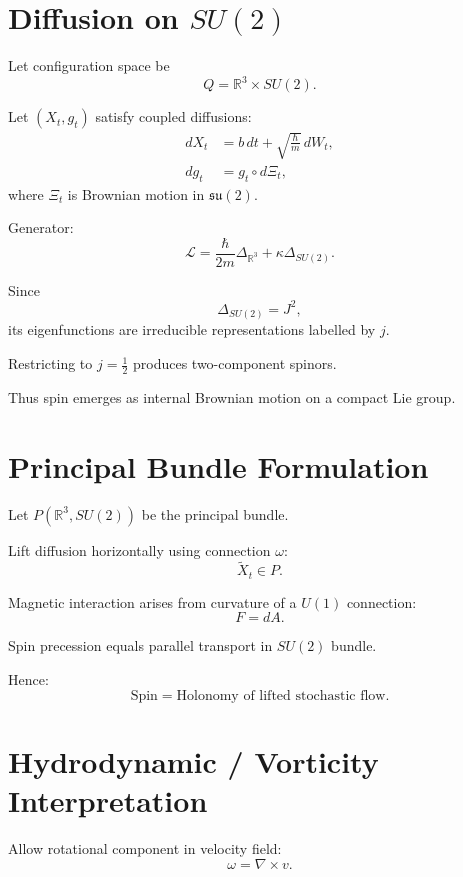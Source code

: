 \documentclass[12pt]{article}
\begin{document}
\section{Diffusion on $SU(2)$}

Let configuration space be
\[
Q=\mathbb{R}^3\times SU(2).
\]

Let $(X_t,g_t)$ satisfy coupled diffusions:
\begin{align}
dX_t &= b\,dt + \sqrt{\frac{\hbar}{m}}\,dW_t,\\
dg_t &= g_t \circ d\Xi_t,
\end{align}
where $\Xi_t$ is Brownian motion in $\mathfrak{su}(2)$.

Generator:
\begin{equation}
\mathcal{L}
=
\frac{\hbar}{2m}\Delta_{\mathbb{R}^3}
+
\kappa \Delta_{SU(2)}.
\end{equation}

Since
\[
\Delta_{SU(2)} = J^2,
\]
its eigenfunctions are irreducible representations labelled by $j$.

Restricting to $j=\frac12$ produces two-component spinors.

Thus spin emerges as internal Brownian motion on a compact Lie group.

\section{Principal Bundle Formulation}

Let $P(\mathbb{R}^3,SU(2))$ be the principal bundle.

Lift diffusion horizontally using connection $\omega$:
\[
\tilde{X}_t \in P.
\]

Magnetic interaction arises from curvature of a $U(1)$ connection:
\[
F=dA.
\]

Spin precession equals parallel transport in $SU(2)$ bundle.

Hence:
\[
\text{Spin} = \text{Holonomy of lifted stochastic flow}.
\]

\section{Hydrodynamic / Vorticity Interpretation}

Allow rotational component in velocity field:
\[
\omega=\nabla\times v.
\]
\end{document}
